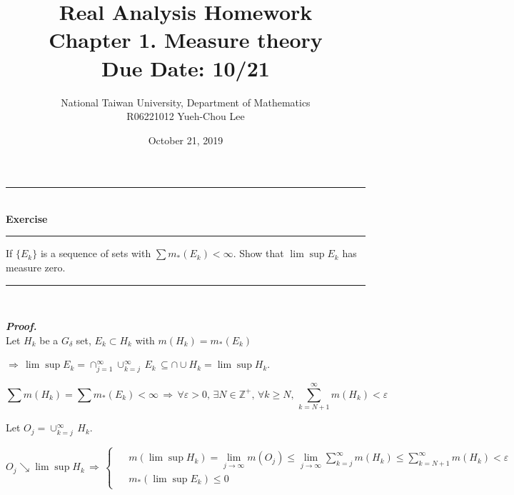 \documentclass[a4paper,11pt]{article}
\title{Real Analysis Homework\\ Chapter 1. Measure theory\\ Due Date: 10/21}
\author{National Taiwan University, Department of Mathematics\\
R06221012 \hspace{0.2cm} Yueh-Chou Lee}
\date{October 21, 2019}
\begin{document}
\maketitle


\begin{flushleft}
	\rule[-0.5ex]{17cm}{2pt}\\
		\textbf{Exercise}\\
	\rule[1.5ex]{17cm}{0.5pt}
		If $\{E_k\}$ is a sequence of sets with $\sum m_*(E_k) < \infty$. Show that $\lim \sup E_k$ has measure zero.
	\rule[1.0ex]{17cm}{0.5pt}\
\end{flushleft}

\textbf{\textit{Proof.}}\\

Let $H_k$ be a $G_\delta$ set, $E_k \subset H_k$ with $m(H_k) = m_* (E_k)$

$\Rightarrow\, \lim \sup E_k = \cap_{j=1}^\infty \cup_{k=j}^\infty\, E_k\, \subseteq \cap \cup H_k = \lim \sup H_k$.

$$\sum m(H_k) = \sum m_*(E_k) < \infty\,
\Rightarrow\,
\forall \varepsilon > 0,\, \exists N \in \mathbb{Z}^+,\,
\forall k \geq N,\, \sum_{k=N+1}^\infty m(H_k) < \varepsilon$$

Let $O_j = \cup_{k=j}^\infty\,H_k$.

$$O_j \searrow \lim \sup H_k
\,\Rightarrow\, \left\{
\begin{matrix} \begin{aligned}
&m(\lim \sup H_k) = \lim_{j \to \infty} m(O_j)
\leq \lim_{j \to \infty} \sum_{k = j}^\infty m(H_k)
\leq \sum_{k = N+1}^\infty m(H_k) < \varepsilon\\
&m_*(\lim \sup E_k) \leq 0
\end{aligned} \end{matrix}\right.$$


			
\end{document}
